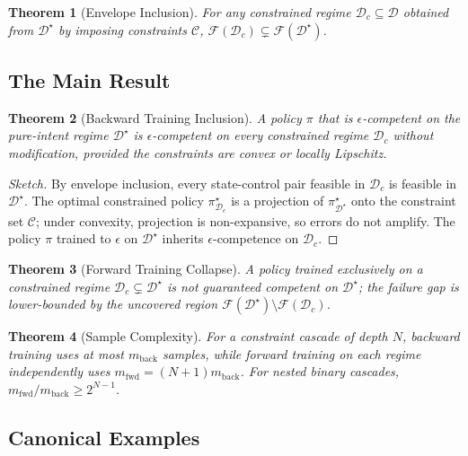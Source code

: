 \documentclass[twocolumn,11pt,a4paper]{article}
\newtheorem{theorem}{Theorem}[section]
\begin{document}
\begin{theorem}[Envelope Inclusion]
For any constrained regime $\mathcal{D}_c \subseteq \mathcal{D}$ obtained from $\mathcal{D}^\star$ by imposing constraints $\mathcal{C}$, $\mathcal{F}(\mathcal{D}_c) \subsetneq \mathcal{F}(\mathcal{D}^\star)$.
\end{theorem}

\subsection{The Main Result}

\begin{theorem}[Backward Training Inclusion]
\label{thm:backward_training}
A policy $\pi$ that is $\epsilon$-competent on the pure-intent regime $\mathcal{D}^\star$ is $\epsilon$-competent on every constrained regime $\mathcal{D}_c$ without modification, provided the constraints are convex or locally Lipschitz.
\end{theorem}

\begin{proof}[Sketch]
By envelope inclusion, every state-control pair feasible in $\mathcal{D}_c$ is feasible in $\mathcal{D}^\star$. The optimal constrained policy $\pi^\star_{\mathcal{D}_c}$ is a projection of $\pi^\star_{\mathcal{D}^\star}$ onto the constraint set $\mathcal{C}$; under convexity, projection is non-expansive, so errors do not amplify. The policy $\pi$ trained to $\epsilon$ on $\mathcal{D}^\star$ inherits $\epsilon$-competence on $\mathcal{D}_c$.
\end{proof}

\begin{theorem}[Forward Training Collapse]
A policy trained exclusively on a constrained regime $\mathcal{D}_c \subsetneq \mathcal{D}^\star$ is not guaranteed competent on $\mathcal{D}^\star$; the failure gap is lower-bounded by the uncovered region $\mathcal{F}(\mathcal{D}^\star) \setminus \mathcal{F}(\mathcal{D}_c)$.
\end{theorem}

\begin{theorem}[Sample Complexity]
For a constraint cascade of depth $N$, backward training uses at most $m_{\text{back}}$ samples, while forward training on each regime independently uses $m_{\text{fwd}} = (N+1) m_{\text{back}}$. For nested binary cascades, $m_{\text{fwd}}/m_{\text{back}} \geq 2^{N-1}$.
\end{theorem}

\subsection{Canonical Examples}
\end{document}
